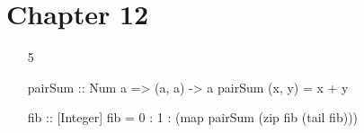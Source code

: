 \documentclass{article}
\begin{document}
\section{Chapter 12}
\begin{enumerate}
\item[5] 
\begin{code}
pairSum :: Num a => (a, a) -> a
pairSum (x, y) = x + y

fib :: [Integer]
fib = 0 : 1 : (map pairSum (zip fib (tail fib)))
\end{code}
\end{enumerate}
\end{document}
